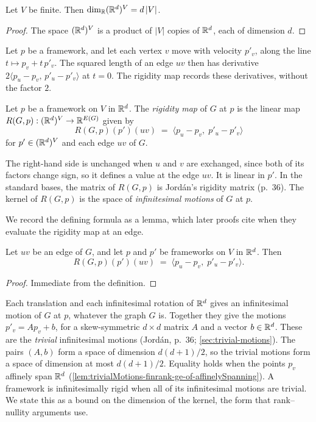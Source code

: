 \begin{lemma}
  \label{lem:framework-finrank}
  \leanok
  Let $V$ be finite. Then $\dim_{{\mathbb{R}}} ({\mathbb{R}}^{d})^{V} = d\,|V|$.
\end{lemma}
\begin{proof}
  \leanok
  The space $({\mathbb{R}}^{d})^{V}$ is a product of $|V|$ copies of ${\mathbb{R}}^{d}$,
  each of dimension $d$.
\end{proof}

Let $p$ be a framework, and let each vertex $v$ move with velocity
$p'_v$, along the line $t \mapsto p_v + t\,p'_v$. The squared length
of an edge $uv$ then has derivative
$2 \langle p_u - p_v,\, p'_u - p'_v \rangle$ at $t = 0$. The rigidity
map records these derivatives, without the factor $2$.

\begin{definition}
  \label{def:rigidityMap}
  \leanok
  Let $p$ be a framework on $V$ in ${\mathbb{R}}^{d}$. The \emph{rigidity map}
  of $G$ at $p$ is the linear map
  $R(G, p) : ({\mathbb{R}}^{d})^{V} \to {\mathbb{R}}^{E(G)}$ given by
  \[
    R(G, p)(p')(uv) \;=\; \langle p_u - p_v,\; p'_u - p'_v \rangle
  \]
  for $p' \in ({\mathbb{R}}^{d})^{V}$ and each edge $uv$ of $G$.
\end{definition}
The right-hand side is unchanged when $u$ and $v$ are exchanged, since
both of its factors change sign, so it defines a value at the edge
$uv$. It is linear in $p'$. In the standard bases, the matrix of
$R(G, p)$ is Jord\'an's rigidity matrix (p.~36). The kernel of
$R(G, p)$ is the space of \emph{infinitesimal motions} of $G$ at $p$.

We record the defining formula as a lemma, which later proofs cite
when they evaluate the rigidity map at an edge.

\begin{lemma}
  \label{lem:rigidityMap-apply}
  \leanok
  Let $uv$ be an edge of $G$, and let $p$ and $p'$ be frameworks on $V$
  in ${\mathbb{R}}^{d}$. Then
  \[
    R(G, p)(p')(uv) \;=\; \langle p_u - p_v,\; p'_u - p'_v \rangle.
  \]
\end{lemma}
\begin{proof}
  \leanok
  Immediate from the definition.
\end{proof}

Each translation and each infinitesimal rotation of ${\mathbb{R}}^{d}$ gives an
infinitesimal motion of $G$ at $p$, whatever the graph $G$ is.
Together they give the motions $p'_v = A p_v + b$, for a
skew-symmetric $d \times d$ matrix $A$ and a vector $b \in {\mathbb{R}}^{d}$.
These are the \emph{trivial} infinitesimal motions (Jord\'an, p.~36;
\cref{sec:trivial-motions}). The pairs
$(A, b)$ form a space of dimension $d(d+1)/2$, so the trivial motions
form a space of dimension at most $d(d+1)/2$. Equality holds when the
points $p_v$ affinely span ${\mathbb{R}}^{d}$
(\cref{lem:trivialMotions-finrank-ge-of-affinelySpanning}). A framework
is infinitesimally rigid when all of its infinitesimal motions are
trivial. We state this as a bound on the dimension of the kernel, the
form that rank--nullity arguments use.

